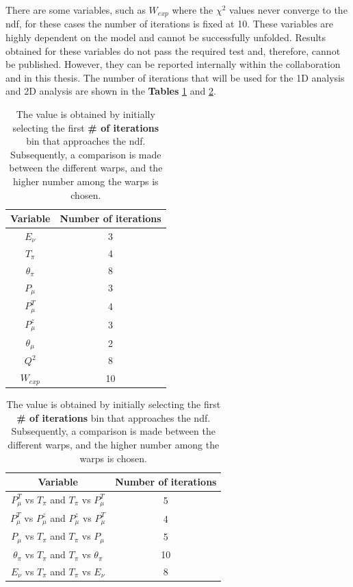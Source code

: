 There are some variables, such as $W_{exp}$ where the $\chi^2$ values never converge to the ndf, for these cases the number of iterations is fixed at 10. These variables are highly dependent on the model and cannot be successfully unfolded. Results obtained for these variables do not pass the required test and, therefore, cannot be published. However, they can be reported internally within the collaboration and in this thesis. The number of iterations that will be used for the 1D analysis and 2D analysis are shown in the \textbf{Tables} \ref{tab:Analysis:Unfolding:1DIterations} and \ref{tab:Analysis:Unfolding:2DIterations}.
\begin{table}[!htb]
    \centering
    \begin{tabular}{c|c}
        Variable & Number of iterations \\ \hline
        $E_\nu$  & 3\\
        $T_\pi$  & 4\\
        $\theta_\pi$ & 8\\
        $P_\mu$ & 3\\
        $P^T_\mu$ & 4\\
        $P^z_\mu$ & 3\\
        $\theta_\mu$ & 2 \\
        $Q^2$ & 8\\
        $W_{exp}$ & 10
    \end{tabular}
    \caption{The value is obtained by initially selecting the first \textbf{\# of iterations} bin that approaches the ndf. Subsequently, a comparison is made between the different warps, and the higher number among the warps is chosen.}
    \label{tab:Analysis:Unfolding:1DIterations}
\end{table}

\begin{table}[!htb]
    \centering
    \begin{tabular}{c|c}
        Variable & Number of iterations \\ \hline
        $P^T_\mu$ vs $T_\pi$ and $T_\pi$ vs $P^T_\mu$ & 5\\
        $P^T_\mu$ vs $P^z_\mu$ and $P^z_\mu$ vs $P^T_\mu$ & 4\\
        $P_\mu$ vs $T_\pi$ and $T_\pi$ vs $P_\mu$ & 5\\
        $\theta_\pi$ vs $T_\pi$ and $T_\pi$ vs $\theta_\pi$ & 10\\
        $E_\nu$ vs $T_\pi$ and $T_\pi$ vs $E_\nu$ & 8
    \end{tabular}
    \caption{The value is obtained by initially selecting the first \textbf{\# of iterations} bin that approaches the ndf. Subsequently, a comparison is made between the different warps, and the higher number among the warps is chosen.}
    \label{tab:Analysis:Unfolding:2DIterations}
\end{table}


